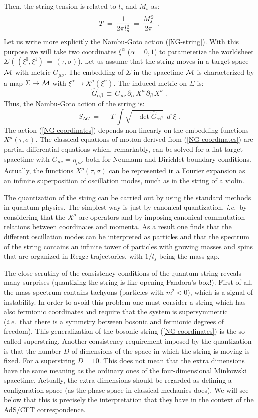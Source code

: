 \documentclass[12pt,notitlepage]{article}
\newcommand{\beq}{\begin{equation}}
\newcommand{\eeq}{\end{equation}}
\def\ie{{\emph{i.e.}}}
\begin{document}
Then, the string tension is related to $l_s$ and $M_s$ as:
\beq
T\,=\,{1\over 2\pi l_s^2}\,=\,{M_s^2\over 2\pi}\,\,.
\eeq
Let us write more explicitly the Nambu-Goto action (\ref{NG-string}). With this purpose we will take two coordinates $\xi^{\alpha}$ ($\alpha=0,1$) to parameterize the worldsheet 
$\Sigma$ ( $(\xi^0, \xi^1)\,=\,(\tau, \sigma)$). Let us assume that the string moves in a target space  ${\cal M}$ with metric $G_{\mu\nu}$. The embedding of $\Sigma$ in the spacetime ${\cal M}$  is characterized by a map $\Sigma\rightarrow {\cal M}$ with $\xi^{\alpha}\rightarrow X^{\mu}(\xi^{\alpha})$. The induced metric on $\Sigma$ is:
\beq
\hat G_{\alpha\beta}\,\equiv \,G_{\mu\nu}\,\partial_{\alpha}\, X^{\mu}\,
\partial_{\beta}\, X^{\nu}\,\,.
\eeq
Thus, the Nambu-Goto action of the string  is:
\beq
S_{NG}\,=\,-T\,\int \sqrt{-\det \hat G_{\alpha\beta}}\,\,\,d^2\xi\,\,.
\label{NG-coordinates}
\eeq
The action  (\ref{NG-coordinates}) depends non-linearly on the embedding functions $X^{\mu} (\tau, \sigma)$. The classical equations of motion derived from (\ref{NG-coordinates}) are partial differential equations which, remarkably, can be solved for a flat target spacetime with $G_{\mu\nu}=\eta_{\mu\nu}$, both for Neumann  and Dirichlet  boundary conditions. Actually, the functions $X^{\mu} (\tau, \sigma)$ can be represented in a Fourier expansion as an infinite superposition of oscillation modes, much as in the string of a violin. 


The quantization of the string can be carried out by using the standard methods in quantum physics. The simplest way is just by canonical quantization, \ie\ by considering that the $X^{\mu}$ are operators and by imposing canonical commutation relations between coordinates and momenta. As a result one finds that the different oscillation modes can be interpreted as particles and that the spectrum of the string contains an infinite tower of particles with growing masses and spins that are organized in Regge trajectories, with $1/ l_s$ being the mass gap.

The close scrutiny of the consistency conditions of the quantum string reveals many surprises (quantizing the string is like opening Pandora's box!). First of all, the mass spectrum contains tachyons (particles with $m^2<0$), which is a signal of instability. In order to avoid this problem one must consider a string which has also fermionic coordinates and require that the system is supersymmetric (\ie\ that there is a symmetry between bosonic and fermionic degrees of freedom). This generalization of the bosonic string (\ref{NG-coordinates}) is the so-called superstring. Another consistency requirement imposed by the quantization is that the number $D$ of dimensions of the space in which the string is moving is fixed. For a superstring $D=10$. This does not mean that the extra dimensions have the same meaning as the ordinary ones of the four-dimensional Minkowski spacetime. Actually,  the extra dimensions should be regarded as defining a configuration space (as  the phase space in classical mechanics does). We will see below that this is precisely the interpretation that they have in the context of the AdS/CFT correspondence. 
\end{document}
